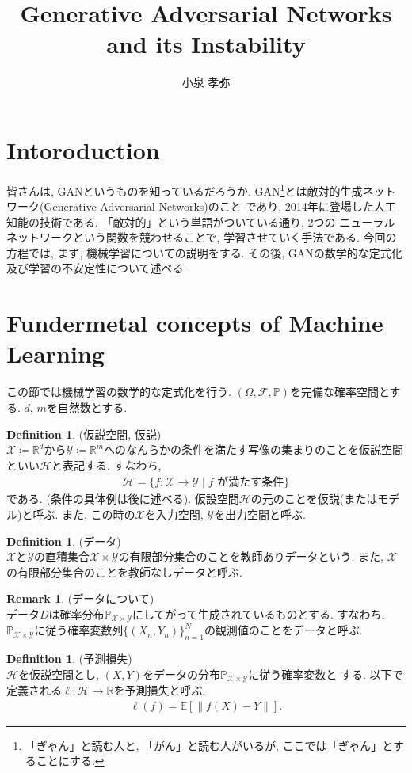 \documentclass[11pt, a4paper, dvipdfmx]{jsarticle}
\title{Generative Adversarial Networks and its Instability}
\author{小泉 孝弥}
\date{}
\theoremstyle{definition}
\newtheorem{Definition+}[Axiom+]{Definition}
\newtheorem{Remark+}[Axiom+]{Remark}
\newcommand{\R}{\mathbb{R}}
\newcommand{\F}{\mathcal{F}}
\newcommand{\X}{\mathcal{X}}
\newcommand{\Y}{\mathcal{Y}}
\newcommand{\Hil}{\mathcal{H}}
\renewcommand{\P}{\mathbb{P}}
\newcommand{\Probsp}{(\Omega, \F, \P)}
\begin{document}
\maketitle
\section{Intoroduction}
皆さんは, GANというものを知っているだろうか. GAN\footnote{「ぎゃん」と読む人と, 「がん」と読む人がいるが, ここでは「ぎゃん」とすることにする.}とは敵対的生成ネットワーク(Generative Adversarial Networks)のこと
であり, 2014年に登場した人工知能の技術である. 「敵対的」という単語がついている通り, 2つの
ニューラルネットワークという関数を競わせることで, 学習させていく手法である. 
今回の方程では, まず, 機械学習についての説明をする. その後, GANの数学的な定式化及び学習の不安定性について述べる.
\section{Fundermetal concepts of Machine Learning}
この節では機械学習の数学的な定式化を行う. $\Probsp$を完備な確率空間とする.
$d$, $m$を自然数とする.
\begin{Definition+}(仮説空間, 仮説)\\
    $\X\coloneqq\R^d$から$\Y\coloneqq\R^m$へのなんらかの条件を満たす写像の集まりのことを仮説空間
    といい$\Hil$と表記する. すなわち,
    \begin{align*}
        \Hil = \{f:\X\to\Y\mid f\text{ が満たす条件}\}
    \end{align*}
    である. (条件の具体例は後に述べる). 仮設空間$\Hil$の元のことを仮説(またはモデル)と呼ぶ.
    また, この時の$\X$を入力空間, $\Y$を出力空間と呼ぶ. 
\end{Definition+}
\begin{Definition+}(データ)\\
    $\X$と$\Y$の直積集合$\X\times\Y$の有限部分集合のことを教師ありデータという.
    また, $\X$の有限部分集合のことを教師なしデータと呼ぶ. 
\end{Definition+}
\begin{Remark+}(データについて)\\
    データ$D$は確率分布$\mathbb{P}_{\X\times\Y}$にしてがって生成されているものとする. すなわち, 
    $\mathbb{P}_{\X\times\Y}$に従う確率変数列$\{(X_{n}, Y_{n})\}_{n = 1}^{N}$の観測値のことをデータと呼ぶ.
\end{Remark+}
\begin{Definition+}(予測損失)\\
    $\Hil$を仮説空間とし, $(X, Y)$をデータの分布$\mathbb{P}_{\X\times\Y}$に従う確率変数と
    する. 以下で定義される$\ell:\Hil\to\R$を予測損失と呼ぶ.
    \begin{align*}
        \ell(f) = \mathbb{E}[\|f(X) - Y\|].
    \end{align*}
\end{Definition+}
\end{document}
